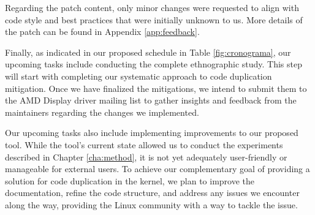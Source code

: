 Regarding the patch content, only minor changes were requested to align with code 
style and best practices that were initially unknown to us. More details of the 
patch can be found in Appendix \ref{app:feedback}.



Finally, as indicated in our proposed schedule in Table \ref{fig:cronograma}, 
our upcoming tasks include conducting the complete ethnographic study.
This step will start with completing our systematic approach to code 
duplication mitigation. Once we have finalized the mitigations, we intend 
to submit them to the AMD Display driver mailing list to gather insights 
and feedback from the maintainers regarding the changes we implemented.

Our upcoming tasks also include implementing improvements to our proposed tool. 
While the tool’s current state allowed us to conduct the experiments described in 
Chapter \ref{cha:method},
it is not yet adequately user-friendly or manageable for external users. 
To achieve our complementary goal of providing a solution for code duplication 
in the kernel, we plan to improve the documentation, refine the code structure, 
and address any issues we encounter along the way, providing the Linux community 
with a way to tackle the issue.
